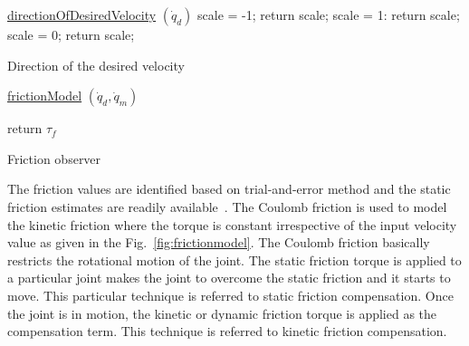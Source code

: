 
\begin{algorithm}

    \underline{directionOfDesiredVelocity} $(\dot{q}_d)$\;
    {
    		scale = -1;
		return scale;
    }
    {
    		scale = 1:
    		return scale;
    }
    \uElse
    {
    		scale = 0;
    		return scale;
    }
    \caption{Direction of the desired velocity}
\end{algorithm}

\begin{algorithm}

    \underline{frictionModel} $(\dot{q}_d, \dot{q}_m)$\;
    {
    }

    return $\tau_f$\;
    \caption{Friction observer}
\end{algorithm}

The friction values are identified based on trial-and-error method and the static friction estimates are readily available~\cite{RnD2Rajagopal}. The Coulomb friction is used to model the kinetic friction where the torque is constant irrespective of the input velocity value as given in the Fig.~\ref{fig:frictionmodel}. The Coulomb friction basically restricts the rotational motion of the joint. The static friction torque is applied to a particular joint makes the joint to overcome the static friction and it starts to move. This particular technique is referred to static friction compensation. Once the joint is in motion, the kinetic or dynamic friction torque is applied as the compensation term. This technique is referred to kinetic friction compensation.

